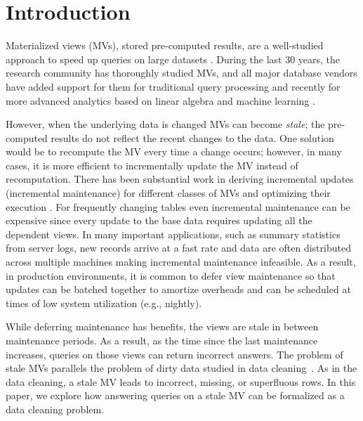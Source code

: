 \vspace{-0.5em}
\section{Introduction}
Materialized views (MVs), stored pre-computed results, are a well-studied approach to speed up queries on large datasets \cite{LarsonY85, gupta1995maintenance, chirkova2011materialized, halevy2001answering}.
During the last 30 years, the research community has thoroughly studied MVs, and all major database vendors have added support for them for traditional query processing and recently for more advanced analytics based on linear algebra and machine learning \cite{nikolic2014linview, zhang2014mat}.

However, when the underlying data is changed MVs can become \emph{stale}; the pre-computed results do not reflect the recent changes to the data. 
One solution would be to recompute the MV every time a change occurs; however, in many cases, it is more efficient to incrementally update the MV instead of recomputation.
There has been substantial work in deriving incremental updates (incremental maintenance) for different classes of MVs and optimizing their execution \cite{chirkova2011materialized}.
For frequently changing tables even incremental maintenance can be expensive since every update to the base data requires updating all the dependent views.  
In many important applications, such as summary statistics from server logs, new records arrive at a fast rate and data are often distributed across multiple machines making incremental maintenance infeasible. 
As a result, in production environments, it is common to defer view maintenance \cite{chirkova2011materialized, zhou2007lazy, DBLP:conf/sigmod/ColbyGLMT96} so that updates can be batched together to amortize overheads and can be scheduled at times of low system utilization (e.g., nightly).  

While deferring maintenance has benefits, the views are stale in between maintenance periods.
As a result, as the time since the last maintenance increases, queries on those views can return incorrect answers.
The problem of stale MVs parallels the problem of dirty data studied in data cleaning~\cite{rahm2000data}.
As in the data cleaning, a stale MV leads to incorrect, missing, or superfluous rows.
In this paper, we explore how answering queries on a stale MV can be formalized as a data cleaning problem. 

